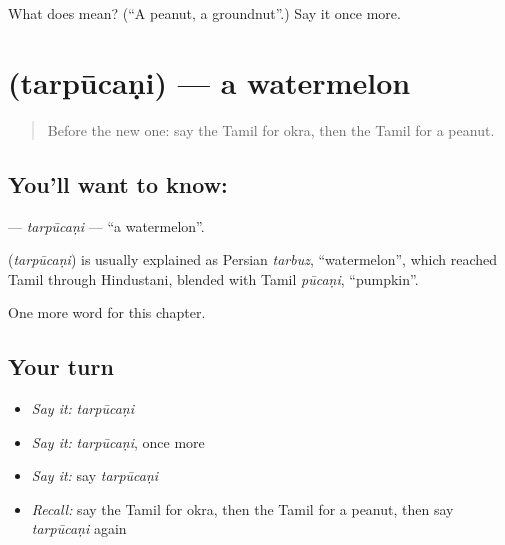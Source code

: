 \begin{tcolorbox}[breakable,colback=teal!4,colframe=teal!35!black,title={Before you move on}]
What does  mean? (\textquotedblleft{}A peanut, a groundnut\textquotedblright{}.) Say it once more.
\end{tcolorbox}
\section[\texorpdfstring{\ta{தர்பூசணி} (tarpūcaṇi)}{தர்பூசணி (tarpūcaṇi)}]{ (tarpūcaṇi) — a watermelon}

\label{lesson:TA-C278-tarpucani}



\begin{quote}
Before the new one: say the Tamil for okra, then the Tamil for a peanut.
\end{quote}

\subsection*{You'll want to know: }
\textbf{} — \emph{tarpūcaṇi} — \textquotedblleft{}a watermelon\textquotedblright{}.

\begin{cousinweb}
\textbf{} (\emph{tarpūcaṇi}) is usually explained as Persian \emph{tarbuz}, \textquotedblleft{}watermelon\textquotedblright{}, which reached Tamil through Hindustani, blended with Tamil \emph{pūcaṇi}, \textquotedblleft{}pumpkin\textquotedblright{}.
\end{cousinweb}

\begin{grammarlens}[title={What you've built}]
One more word for this chapter.
\end{grammarlens}

\subsection*{Your turn}
\begin{itemize}
\raggedright
  \item \emph{Say it:} \emph{tarpūcaṇi}
  \item \emph{Say it:} \emph{tarpūcaṇi}, once more
  \item \emph{Say it:} say \emph{tarpūcaṇi}
  \item \emph{Recall:} say the Tamil for okra, then the Tamil for a peanut, then say \emph{tarpūcaṇi} again
\end{itemize}

